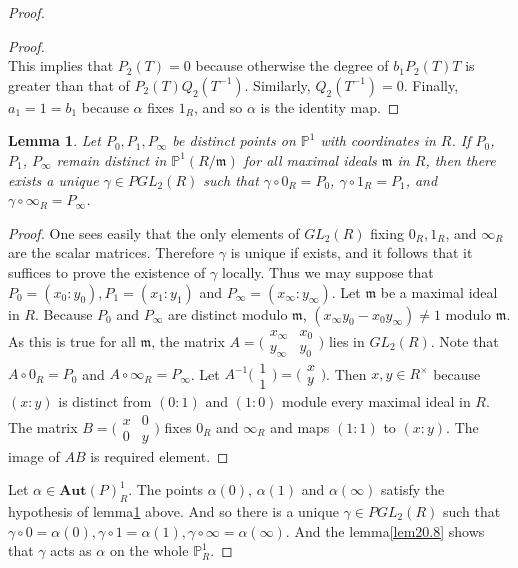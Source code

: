 \documentclass[12pt,a4paper,english]{article}
\theoremstyle{plain}
\newtheorem{lem}[thm]{Lemma}
\theoremstyle{definition}
\begin{document}
\begin{proof}
\begin{proof}
\begin{equation*}
\end{equation*}
This implies that $P_{2}(T)=0$ because otherwise the degree of $b_{1}P_{2}(T)T$ is greater than that of $P_{2}(T)Q_{2}(T^{-1})$. Similarly, $Q_{2}(T^{-1})=0$. Finally, $a_{1}=1=b_{1}$ because $\alpha$ fixes $1_{R}$, and so $\alpha$ is the identity map.
\end{proof}
\begin{lem}\label{lem20.9}
Let $P_{0}, P_{1}, P_{\infty}$ be distinct points on $\mathbb{P}^{1}$ with coordinates in $R$. If $P_{0}$, $P_{1}$, $P_{\infty}$ remain distinct in $\mathbb{P}^{1}(R/\mathfrak{m})$ for all maximal ideals $\mathfrak{m}$ in $R$, then there exists a unique $\gamma\in PGL_{2}(R)$ such that $\gamma\circ 0_{R}=P_{0}$, $\gamma\circ 1_{R}=P_{1}$, and $\gamma\circ \infty_{R}=P_{\infty}$.
\end{lem}
\begin{proof}
One sees easily that the only elements of $GL_{2}(R)$ fixing $0_{R}, 1_{R}$, and $\infty_{R}$ are the scalar matrices. Therefore $\gamma$ is unique if exists, and it follows that it suffices to prove the existence of $\gamma$ locally. Thus we may suppose that $P_{0}=(x_{0}:y_{0}), P_{1}=(x_{1}:y_{1})$ and $P_{\infty}=(x_{\infty}:y_{\infty})$. Let $\mathfrak{m}$ be a maximal ideal in $R$. Because $P_{0}$ and $P_{\infty}$ are distinct modulo $\mathfrak{m}$, $(x_{\infty}y_{0}-x_{0}y_{\infty})\not=1$ modulo $\mathfrak{m}$. As this is true for all $\mathfrak{m}$, the matrix $A=\bigg(\begin{array}{cc}
    x_{\infty} & x_{0} \\
    y_{\infty} & y_{0}
\end{array}\bigg)$ lies in $GL_{2}(R)$. Note that $A\circ 0_{R}=P_{0}$ and $A\circ \infty_{R}=P_{\infty}$. Let $A^{-1}\bigg(\begin{array}{c}
     1  \\
      1
\end{array}\bigg)=\bigg(\begin{array}{c}
     x  \\
      y
\end{array}\bigg)$. Then $x, y\in R^{\times}$ because $(x:y)$ is distinct from $(0:1)$ and $(1:0)$ module every maximal ideal in $R$. The matrix $B=\bigg(\begin{array}{cc}
    x & 0 \\
    0 & y
\end{array}\bigg)$ fixes $0_{R}$ and $\infty_{R}$ and maps $(1:1)$ to $(x:y)$. The image of $AB$ is required element. 
\end{proof}


Let $\alpha\in\textbf{Aut}(P)^{1}_{R}$. The points $\alpha(0)$, $\alpha(1)$ and $\alpha(\infty)$ satisfy the hypothesis of lemma\ref{lem20.9} above. And so there is a unique $\gamma\in PGL_{2}(R)$ such that $\gamma\circ0=\alpha(0),\gamma\circ1=\alpha(1),\gamma\circ\infty=\alpha(\infty)$. And the lemma\ref{lem20.8} shows that $\gamma$ acts as $\alpha$ on the whole $\mathbb{P}^{1}_{R}$.
\end{proof}
\end{document}
